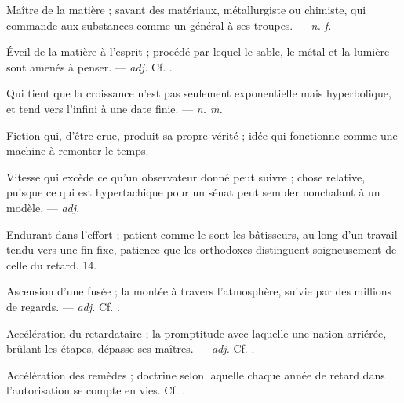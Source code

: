  Maître de la matière ; savant des matériaux, métallurgiste ou chimiste, qui commande aux substances comme un général à ses troupes. ---  \textit{n. f.}

 Éveil de la matière à l'esprit ; procédé par lequel le sable, le métal et la lumière sont amenés à penser. ---  \textit{adj.} Cf. .

 Qui tient que la croissance n'est pas seulement exponentielle mais hyperbolique, et tend vers l'infini à une date finie. ---  \textit{n. m.}

 Fiction qui, d'être crue, produit sa propre vérité ; idée qui fonctionne comme une machine à remonter le temps.

 Vitesse qui excède ce qu'un observateur donné peut suivre ; chose relative, puisque ce qui est hypertachique pour un sénat peut sembler nonchalant à un modèle. ---  \textit{adj.}

 Endurant dans l'effort ; patient comme le sont les bâtisseurs, au long d'un travail tendu vers une fin fixe, patience que les orthodoxes distinguent soigneusement de celle du retard.   14.

 Ascension d'une fusée ; la montée à travers l'atmosphère, suivie par des millions de regards.  ---  \textit{adj.} Cf. .

 Accélération du retardataire ; la promptitude avec laquelle une nation arriérée, brûlant les étapes, dépasse ses maîtres. ---  \textit{adj.} Cf. .

 Accélération des remèdes ; doctrine selon laquelle chaque année de retard dans l'autorisation se compte en vies. Cf. .

